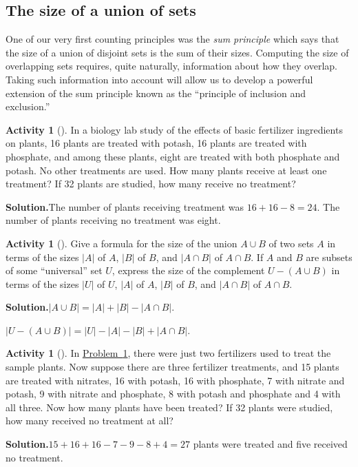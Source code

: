 \documentclass[10pt,]{book}
\theoremstyle{plain}
\theoremstyle{definition}
\newtheorem{activity}[project]{Activity}
\numberwithin{equation}{chapter}
\begin{document}
\subsection[{The size of a union of sets}]{The size of a union of sets}\label{subsection-51}
One of our very first counting principles was the \emph{sum principle} which says that the size of a union of disjoint sets is the sum of their sizes. Computing the size of overlapping sets requires, quite naturally, information about how they overlap. Taking such information into account will allow us to develop a powerful extension of the sum principle known as the ``principle of inclusion and exclusion.''%
\begin{activity}[]\label{fertilizer2}
In a biology lab study of the effects of basic fertilizer ingredients on plants, 16 plants are treated with potash, 16 plants are treated with phosphate, and among these plants, eight are treated with both phosphate and potash. No other treatments are used. How many plants receive at least one treatment? If 32 plants are studied, how many receive no treatment?%
\par\medskip\noindent%
\textbf{Solution.}\quad The number of plants receiving treatment was \(16+16-8 = 24\). The number of plants receiving no treatment was eight.%
\end{activity}
\begin{activity}[]\label{activity-207}
Give a formula for the size of the union \(A\cup B\) of two sets \(A\) in terms of the sizes \(|A|\) of \(A\), \(|B|\) of \(B\), and \(|A\cap B|\) of \(A\cap B\). If \(A\) and \(B\) are subsets of some ``universal'' set \(U\), express the size of the complement \(U-(A\cup B)\) in terms of the sizes \(|U|\) of \(U\), \(|A|\) of \(A\), \(|B|\) of \(B\), and \(|A\cap B|\) of \(A\cap B\).%
\par\medskip\noindent%
\textbf{Solution.}\quad \(|A\cup B|=|A| + |B| - |A\cap B|\).%
\par
\(|U-(A\cup B)| = |U|-|A|-|B| + |A
\cap B|\).%
\end{activity}
\begin{activity}[]\label{activity-208}
In \hyperref[fertilizer2]{Problem~\ref{fertilizer2}}, there were just two fertilizers used to treat the sample plants. Now suppose there are three fertilizer treatments, and 15 plants are treated with nitrates, 16 with potash, 16 with phosphate, 7 with nitrate and potash, 9 with nitrate and phosphate, 8 with potash and phosphate and 4 with all three. Now how many plants have been treated? If 32 plants were studied, how many received no treatment at all?%
\par\medskip\noindent%
\textbf{Solution.}\quad \(15+16+16-7-9-8+4=27\) plants were treated and five received no treatment.%
\end{activity}
\end{document}

